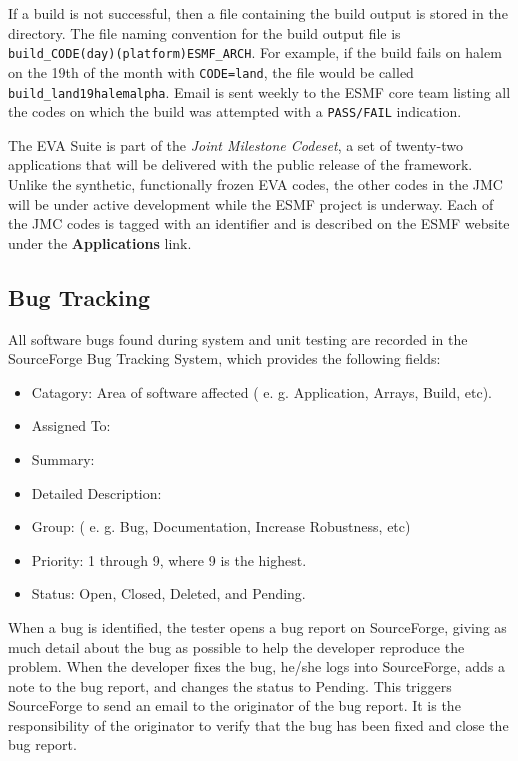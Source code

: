 If a build is not successful, then a file containing the build output is stored in
the directory. The file naming convention for the build output file is
{\tt build\_CODE(day)(platform)ESMF\_ARCH}. For example, if the build fails on halem on the 19th of the month with {\tt CODE=land}, the file
would be called {\tt build\_land19halemalpha}. 
Email is sent weekly to the ESMF core team listing all the codes on which the build was attempted with a {\tt PASS/FAIL} indication. 

The EVA Suite is part of the {\it Joint Milestone
Codeset}, a set of twenty-two applications that will be delivered
with the public release of the framework.  Unlike the synthetic,
functionally frozen EVA codes, the other codes in the JMC will
be under active development while the ESMF project is underway.
Each of the JMC codes is tagged with an identifier and
is described on the ESMF website under the {\bf Applications} link.

\subsection{Bug Tracking}

All software bugs found during system and unit testing are recorded in the SourceForge Bug Tracking 
System, which provides the following fields:
\begin{itemize}
\item Catagory: Area of software affected ( e. g. Application, Arrays, Build, etc).
\item Assigned To: 
\item Summary:
\item Detailed Description:
\item Group: ( e. g. Bug, Documentation, Increase Robustness, etc)
\item Priority: 1 through 9, where 9 is the highest.
\item Status: Open, Closed, Deleted, and Pending.
\end{itemize}

When a bug is identified, the tester opens a bug report on SourceForge, giving as much detail
about the bug as possible to help the developer reproduce the problem. When the developer
fixes the bug, he/she logs into SourceForge, adds a note to the bug report, and changes the status
to Pending. This triggers SourceForge to send an email to the originator of the bug report. It is
the responsibility of the originator to verify that the bug has been fixed and close the bug report.


